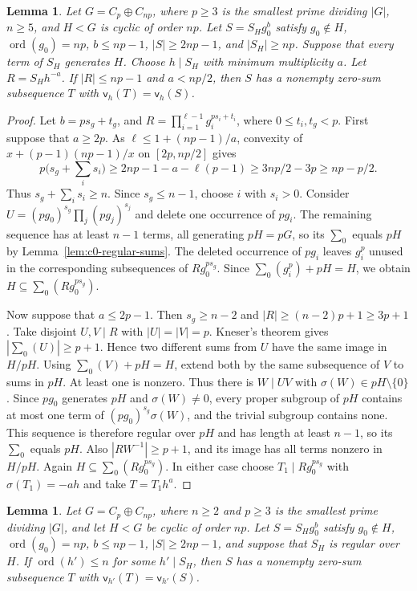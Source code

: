 \documentclass[10pt,a4paper]{amsart}
\newtheorem{lem}[thm]{Lemma}
\theoremstyle{definition}
\theoremstyle{remark}
\numberwithin{equation}{section}
\DeclareMathOperator{\ord}{ord}
\begin{document}
\begin{lem}\label{lem:N-index-p-generators}
Let $G=C_p\oplus C_{np}$, where $p\ge3$ is the smallest prime
dividing $|G|$, $n\ge5$, and $H<G$ is cyclic of order $np$.
Let $S=S_Hg_0^b$ satisfy $g_0\notin H$, $\ord(g_0)=np$,
$b\le np-1$, $|S|\ge2np-1$, and $|S_H|\ge np$.
Suppose that every term of $S_H$ generates $H$.
Choose $h\mid S_H$ with minimum multiplicity $a$.
Let $R=S_Hh^{-a}$. If $|R|\le np-1$ and $a<np/2$,
then $S$ has a nonempty zero-sum subsequence $T$ with $\mathsf v_h(T)=\mathsf v_h(S)$.
\end{lem}

\begin{proof}
Let $b=ps_g+t_g$, and
$R=\prod_{i=1}^{\ell-1}g_i^{ps_i+t_i}$, where $0\le t_i,t_g<p$.
First suppose that $a\ge2p$.
As $\ell\le1+(np-1)/a$, convexity of
$x+(p-1)(np-1)/x$ on $[2p,np/2]$ gives
\[
p\Big(s_g+\sum_i s_i\Big)
\ge2np-1-a-\ell(p-1)
\ge3np/2-3p\ge np-p/2.
\]
Thus $s_g+\sum_i s_i\ge n$.
Since $s_g\le n-1$, choose $i$ with $s_i>0$.
Consider $U=(pg_0)^{s_g}\prod_j(pg_j)^{s_j}$ and delete one
occurrence of $pg_i$.
The remaining sequence has at least $n-1$ terms, all generating
$pH=pG$, so its $\sum_0$ equals $pH$ by
Lemma~\ref{lem:c0-regular-sums}.
The deleted occurrence of $pg_i$ leaves $g_i^p$ unused in the corresponding
subsequences of $Rg_0^{ps_g}$. Since $\sum_0(g_i^p)+pH=H$, we obtain
$H\subseteq\sum_0(Rg_0^{ps_g})$.

Now suppose that $a\le2p-1$.
Then $s_g\ge n-2$ and $|R|\ge(n-2)p+1\ge3p+1$.
Take disjoint $U,V\mid R$ with $|U|=|V|=p$.
Kneser's theorem gives $|\sum_0(U)|\ge p+1$.
Hence two different sums from $U$ have the same image in $H/pH$.
Using $\sum_0(V)+pH=H$, extend both by the same subsequence of $V$
to sums in $pH$. At least one is nonzero.
Thus there is $W\mid UV$ with $\sigma(W)\in pH\setminus\{0\}$.
Since $pg_0$ generates $pH$ and $\sigma(W)\ne0$, every proper
subgroup of $pH$ contains at most one term of $(pg_0)^{s_g}\sigma(W)$,
and the trivial subgroup contains none. This sequence is therefore regular
over $pH$ and has length at least $n-1$, so its $\sum_0$ equals $pH$.
Also $|RW^{-1}|\ge p+1$, and its image has all terms nonzero in $H/pH$.
Again $H\subseteq\sum_0(Rg_0^{ps_g})$.
In either case choose $T_1\mid Rg_0^{ps_g}$ with
$\sigma(T_1)=-ah$ and take $T=T_1h^a$.
\end{proof}

\begin{lem}\label{lem:N-index-p-low-order}
Let $G=C_p\oplus C_{np}$, where $n\ge2$ and $p\ge3$ is the
smallest prime dividing $|G|$, and let $H<G$ be cyclic of order $np$.
Let $S=S_Hg_0^b$ satisfy $g_0\notin H$, $\ord(g_0)=np$,
$b\le np-1$, $|S|\ge2np-1$, and suppose that $S_H$ is regular over $H$.
If $\ord(h')\le n$ for some $h'\mid S_H$, then $S$ has a nonempty zero-sum
subsequence $T$ with $\mathsf v_{h'}(T)=\mathsf v_{h'}(S)$.
\end{lem}
\end{document}
